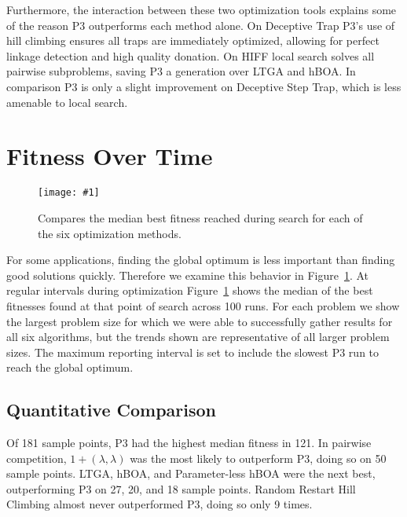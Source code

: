 \documentclass[twoside]{article}
\newcommand{\includegraphicsfit}[1]
{\texttt{[image: \#1]}}
\begin{document}
Furthermore, the interaction between these two optimization tools explains some of the reason P3
outperforms each method alone.
On Deceptive Trap P3's use of hill climbing ensures all traps are immediately optimized, allowing for perfect
linkage detection and high quality donation.
On HIFF local search solves all pairwise subproblems, saving P3 a generation over LTGA and hBOA.
In comparison P3 is only a slight improvement on Deceptive Step Trap, which is less amenable to local search.

\section{Fitness Over Time}
\label{sec-overtime}
\begin{figure}
  \begin{center}
  \includegraphicsfit{fitness-over-time}
  \end{center}
  \caption{Compares the median best fitness reached during search for each of the six optimization methods.}
  \label{fig-fitness-over-time}
\end{figure}

For some applications, finding the global optimum is less important than finding good solutions quickly. Therefore
we examine this behavior in Figure~\ref{fig-fitness-over-time}. At regular intervals during optimization
Figure~\ref{fig-fitness-over-time} shows the median of the best fitnesses found at that point of search across
100 runs. For each problem we show the largest problem size for which we were able to successfully gather results
for all six algorithms, but the trends shown are representative of all larger problem sizes. The maximum reporting interval
is set to include the slowest P3 run to reach the global optimum.


\subsection{Quantitative Comparison}
Of 181 sample points, P3 had the highest median fitness in 121. In pairwise competition, $1+(\lambda, \lambda)$
was the most likely to outperform P3, doing so on 50 sample points. LTGA, hBOA, and Parameter-less hBOA
were the next best, outperforming P3 on 27, 20, and 18 sample points. Random Restart Hill Climbing almost
never outperformed P3, doing so only 9 times.
\end{document}
